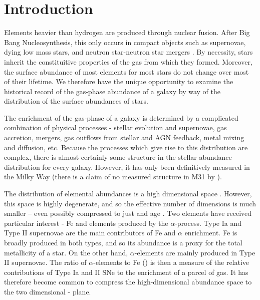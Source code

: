 \section{Introduction} \label{sec:intro}
Elements heavier than hydrogen are produced through nuclear fusion. After Big Bang Nucleosynthesis, this only occurs in compact objects such as supernovae, dying low mass stars, and neutron star-neutron star mergers \citep[e.g.][]{2023A&ARv..31....1A}. By necessity, stars inherit the constituitive properties of the gas from which they formed. Moreover, the surface abundance of most elements for most stars do not change over most of their lifetime. We therefore have the unique opportunity to examine the historical record of the gas-phase abundance of a galaxy by way of the distribution of the surface abundances of stars.

The enrichment of the gas-phase of a galaxy is determined by a complicated combination of physical processes - stellar evolution and supernovae, gas accretion, mergers, gas outflows from stellar and AGN feedback, metal mixing and diffusion, etc. Because the processes which give rise to this distribution are complex, there is almost certainly some structure in the stellar abundance distribution for every galaxy. However, it has only been definitively measured in the Milky Way (there is a claim of no measured structure in M31 by \citet{2024IAUS..377..115N}).


The distribution of elemental abundances is a high dimensional space \citep[e.g., 32 elements in][]{2024ApJ...961L..41J}. However, this space is highly degenerate, and so the effective number of dimensions is much smaller -- even possibly compressed to just \FeH{} and age \citep{2019ApJ...883..177N}. Two elements have received particular interest - Fe and elements produced by the $\alpha$-process. Type Ia and Type II supernovae are the main contributors of Fe and $\alpha$ enrichment. Fe is broadly produced in both types, and so its abundance is a proxy for the total metallicity of a star. On the other hand, $\alpha$-elements are mainly produced in Type II supernovae. The ratio of $\alpha$-elements to Fe (\alphaFe{}) is then a measure of the relative contributions of Type Ia and II SNe to the enrichment of a parcel of gas. It has therefore become common to compress the high-dimensional abundance space to the two dimensional \alphaFe{}-\FeH{} plane.

